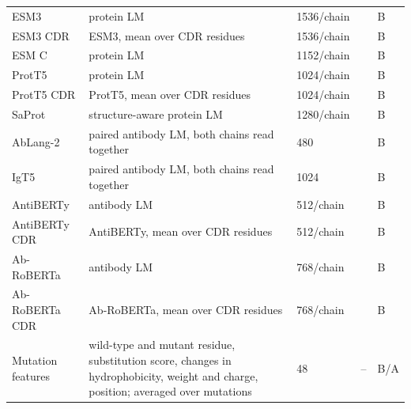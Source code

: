 {\begin{longtable}{P{2.8cm}P{4.6cm}P{2.0cm}P{1.5cm}P{1.4cm}}
ESM3 & protein LM & 1536/chain & \citep{Hayes2025} & B \\
ESM3 CDR & ESM3, mean over CDR residues & 1536/chain & \citep{Hayes2025} & B \\
ESM C & protein LM & 1152/chain & \citep{Candido2026} & B \\
ProtT5 & protein LM & 1024/chain & \citep{Elnaggar2022} & B \\
ProtT5 CDR & ProtT5, mean over CDR residues & 1024/chain & \citep{Elnaggar2022} & B \\
SaProt & structure-aware protein LM & 1280/chain & \citep{Su2023SaProt} & B \\
AbLang-2 & paired antibody LM, both chains read together & 480 & \citep{Olsen2024} & B \\
IgT5 & paired antibody LM, both chains read together & 1024 & \citep{Kenlay2024IgT5} & B \\
AntiBERTy & antibody LM & 512/chain & \citep{Ruffolo2021AntiBERTy} & B \\
AntiBERTy CDR & AntiBERTy, mean over CDR residues & 512/chain & \citep{Ruffolo2021AntiBERTy} & B \\
Ab-RoBERTa & antibody LM & 768/chain & \citep{Huh2025} & B \\
Ab-RoBERTa CDR & Ab-RoBERTa, mean over CDR residues & 768/chain & \citep{Huh2025} & B \\
Mutation features & wild-type and mutant residue, substitution score, changes in hydrophobicity, weight and charge, position; averaged over mutations & 48 & -- & B/A \\
\end{longtable}}

